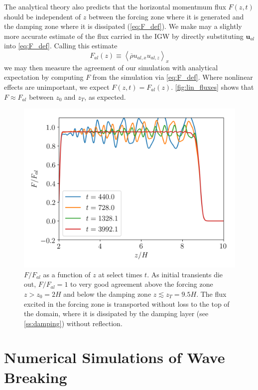 \documentclass[
        fleqn,
        usenatbib,
        referee,
    ]{mnras}
\newcommand*{\ev}[1]{\left\langle#1\right\rangle}
\newcommand*{\bm}[1]{\mathbf{#1}}
\begin{document}
The analytical theory also predicts that the horizontal momentmum flux $F(z, t)$
should be independent of $z$ between the forcing zone where it is generated and
the damping zone where it is dissipated (\autoref{eq:F_def}). We make may a
slightly more accurate estimate of the flux carried in the IGW by directly
substituting $\bm{u}_{al}$ into \autoref{eq:F_def}. Calling this estimate
\begin{equation}
    F_{al}(z) \equiv \ev{\overline{\rho} u_{al,x}u_{al,z}}_x
\end{equation}
we may then measure the agreement of our simulation with analytical expectation
by computing $F$ from the simulation via \autoref{eq:F_def}. Where nonlinear
effects are unimportant, we expect $F(z, t) = F_{al}(z)$.
\autoref{fig:lin_fluxes} shows that $F \approx F_{al}$ between $z_0$ and $z_T$,
as expected.
\begin{figure}
    \centering
    \includegraphics[width=\columnwidth]{plots/lin_fluxes.png}
    \caption{$F/F_{al}$ as a function of $z$ at select times $t$. As
    initial transients die out, $F / F_{al} = 1$ to very good agreement above
    the forcing zone $z > z_0 = 2H$ and below the damping zone $z \lesssim z_T =
    9.5H$. The flux excited in the forcing zone is transported without loss to
    the top of the domain, where it is dissipated by the damping layer (see
    \autoref{ss:damping}) without reflection.}\label{fig:lin_fluxes}
\end{figure}

\section{Numerical Simulations of Wave Breaking}\label{s:sim}
\end{document}
